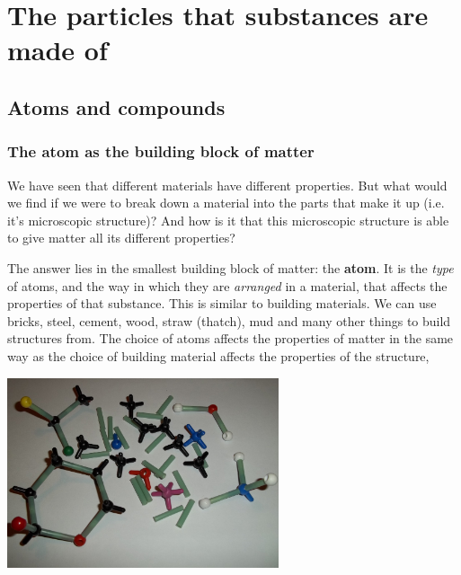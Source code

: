 \chapter{The particles that substances are made of}
\label{chap:composition}
    \setcounter{figure}{1}
    \setcounter{subfigure}{1}
    \label{m38120}
\section{Atoms and compounds}
\subsection*{The atom as the building block of matter}
            \nopagebreak
\label{m38120*id307092}We have seen that different materials have different properties. But what would we find if we were to break down a material into the parts that make it up (i.e. it's microscopic structure)? And how is it that this microscopic structure is able to give matter all its different properties?\par 
{}
\begin{minipage}{.6\textwidth}
\label{m38120*id307099}The answer lies in the smallest building block of  matter: the \textbf{atom}. It is the \textsl{type} of atoms, and the way in which they are \textsl{arranged} in a material, that affects the properties of that substance. This is similar to building materials. We can use bricks, steel, cement, wood, straw (thatch), mud and many other things to build structures from. The choice of atoms affects the properties of matter in the same way as the choice of building material affects the properties of the structure, \par 
\end{minipage}
\begin{minipage}{.4\textwidth}
 \begin{center}
\includegraphics[width=0.6\textwidth]{photos/atom_model_kit.jpg}
 \end{center}
\end{minipage}

